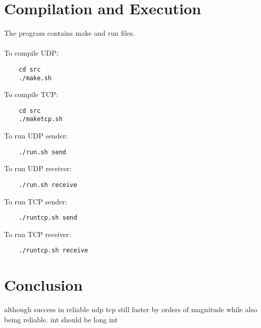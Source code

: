 \documentclass[a4paper,10pt]{article}
\begin{document}
\section{Compilation and Execution}
The program contains make and run files.\\\\
To compile UDP:
\begin{verbatim}
	cd src
	./make.sh
\end{verbatim}
To compile TCP:
\begin{verbatim}
	cd src
	./maketcp.sh
\end{verbatim}
To run UDP sender:
\begin{verbatim}
	./run.sh send
\end{verbatim}
To run UDP receiver:
\begin{verbatim}
	./run.sh receive
\end{verbatim}
To run TCP sender:
\begin{verbatim}
	./runtcp.sh send
\end{verbatim}
To run TCP receiver:
\begin{verbatim}
	./runtcp.sh receive
\end{verbatim}

\section{Conclusion}
although success in reliable udp tcp still faster by orders of magnitude while also being reliable. 
int should be long int

\pagebreak


\end{document}
